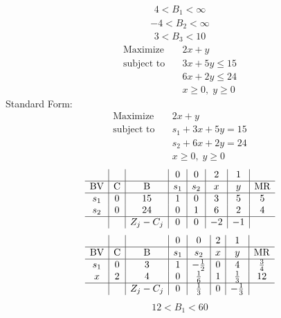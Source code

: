 \documentclass{article}
\begin{document}
\begin{align*}
4<B_{1}<\infty\end{align*}
\begin{align*}
-4<B_{2}<\infty\end{align*}
\begin{align*}
3<B_{3}<10\end{align*}
\begin{align*}
\text{Maximize} \quad & 2x + y\\
\text{subject to} \quad
& 3x + 5y\le15\\
& 6x + 2y\le24\\
& x\ge0,\; y\ge0\end{align*}
Standard Form:\\
\begin{align*}
\text{Maximize} \quad & 2x + y\\
\text{subject to} \quad
& s_{1} + 3x + 5y=15\\
& s_{2} + 6x + 2y=24\\
& x\ge0,\; y\ge0\end{align*}
\begin{align*}
\begin{array}{c|c|c|c|c|c|c|c}
 &  &  & 0 & 0 & 2 & 1 & \\
\hline
\text{BV} & \text{C} & \text{B} & s_{1} & s_{2} & x & y & \text{MR} \\
\hline
s_{1} & 0 & 15 & 1 & 0 & 3 & 5 & 5 \\
s_{2} & 0 & 24 & 0 & 1 & 6 & 2 & 4 \\
\hline
 &  & Z_j-C_j & 0 & 0 & -2 & -1 & \\
\end{array}
\end{align*}
\begin{align*}
\begin{array}{c|c|c|c|c|c|c|c}
 &  &  & 0 & 0 & 2 & 1 & \\
\hline
\text{BV} & \text{C} & \text{B} & s_{1} & s_{2} & x & y & \text{MR} \\
\hline
s_{1} & 0 & 3 & 1 & -\frac{1}{2} & 0 & 4 & \frac{3}{4} \\
x & 2 & 4 & 0 & \frac{1}{6} & 1 & \frac{1}{3} & 12 \\
\hline
 &  & Z_j-C_j & 0 & \frac{1}{3} & 0 & -\frac{1}{3} & \\
\end{array}
\end{align*}
\begin{align*}
12<B_{1}<60\end{align*}
\end{document}
